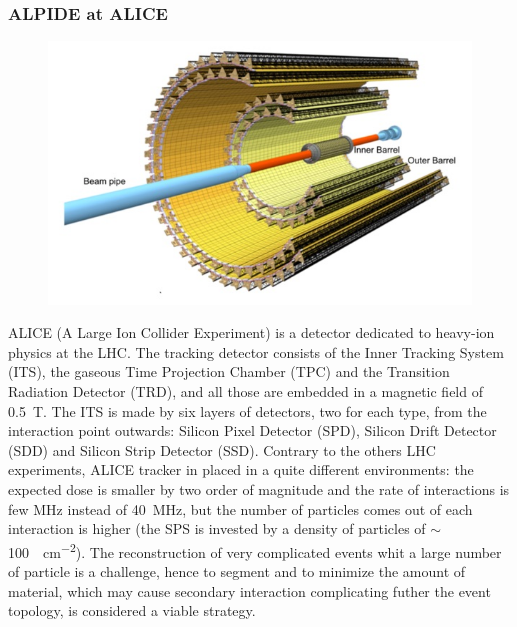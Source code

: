         \subsubsection{ALPIDE at ALICE}
        \begin{figure}[h!]
            \centering
            \includegraphics[width=.7\linewidth]{figures/pixel_detectors_usage/alice.png}
            \caption{}
            \label{fig:}
        \end{figure}
        ALICE (A Large Ion Collider Experiment) is a detector dedicated to heavy-ion physics at the LHC. 
        The tracking detector consists of the Inner Tracking System (ITS), the gaseous Time Projection Chamber (TPC) and the Transition Radiation Detector (TRD), and all those are embedded in a magnetic field of \SI{0.5}{T}. The ITS is made by six layers of detectors, two for each type, from the interaction point outwards: Silicon Pixel Detector (SPD), Silicon Drift Detector (SDD) and Silicon Strip Detector (SSD).         
        Contrary to the others LHC experiments, ALICE tracker in placed in a quite different environments: the expected dose is smaller by two order of magnitude and the rate of interactions is few \si{MHz} instead of \SI{40}{MHz}, but the number of particles comes out of each interaction is higher (the SPS is invested by a density of particles of $\sim$\SI{100}{\per cm\tothe{-2}}).  
        The reconstruction of very complicated events whit a large number of particle is a challenge, hence to segment and to minimize the amount of material, which may cause secondary interaction complicating futher the event topology, is considered a viable strategy. 
        
